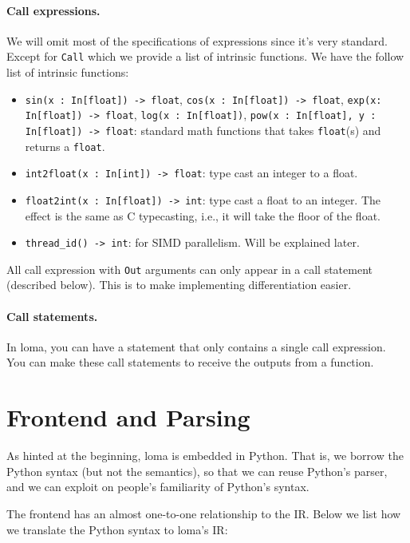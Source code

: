 \paragraph{Call expressions.}
We will omit most of the specifications of expressions since it's very standard. Except for \lstinline{Call} which we provide a list of intrinsic functions. We have the follow list of intrinsic functions:

\begin{itemize}
\item \lstinline{sin(x : In[float]) -> float}, \lstinline{cos(x : In[float]) -> float}, \lstinline{exp(x: In[float]) -> float}, \lstinline{log(x : In[float])}, \lstinline{pow(x : In[float], y : In[float]) -> float}: standard math functions that takes \lstinline{float}(s) and returns a \lstinline{float}.
\item \lstinline{int2float(x : In[int]) -> float}: type cast an integer to a float.
\item \lstinline{float2int(x : In[float]) -> int}: type cast a float to an integer. The effect is the same as C typecasting, i.e., it will take the floor of the float.
\item \lstinline{thread_id() -> int}: for SIMD parallelism. Will be explained later.
\end{itemize}

All call expression with \lstinline{Out} arguments can only appear in a call statement (described below). This is to make implementing differentiation easier. 

\paragraph{Call statements.}
In loma, you can have a statement that only contains a single call expression. You can make these call statements to receive the outputs from a function.

\section{Frontend and Parsing}
As hinted at the beginning, loma is embedded in Python. That is, we borrow the Python syntax (but not the semantics), so that we can reuse Python's parser, and we can exploit on people's familiarity of Python's syntax. 

The frontend has an almost one-to-one relationship to the IR. Below we list how we translate the Python syntax to loma's IR: 

